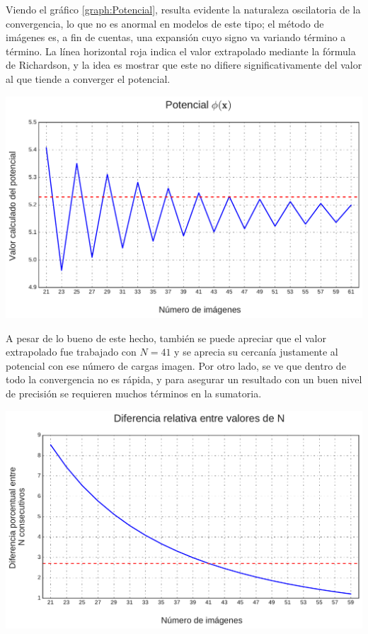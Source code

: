 \documentclass[12pt, oneside, numbers, spanish]{ezthesis}
\numberwithin{equation}{section}
\begin{document}
Viendo el gráfico \ref{graph:Potencial}, resulta evidente la naturaleza oscilatoria de la convergencia, lo que no es anormal en modelos de este tipo; el método de imágenes es, a fin de cuentas, una expansión cuyo signo va variando término a término. La línea horizontal roja indica el valor extrapolado mediante la fórmula de Richardson, y la idea es mostrar que este no difiere significativamente del valor al que tiende a converger el potencial.
\begin{graph}[h]
	\centering
	\includegraphics[scale = 0.5]{./Figures/Potencial}
	\caption{}\label{graph:Potencial}
\end{graph}
\noindent
A pesar de lo bueno de este hecho, también se puede apreciar que el valor extrapolado fue trabajado con $N=41$ y se aprecia su cercanía justamente al potencial con ese número de cargas imagen. Por otro lado, se ve que dentro de todo la convergencia no es rápida, y para asegurar un resultado con un buen nivel de precisión se requieren muchos términos en la sumatoria.
\begin{graph}[h]
	\centering
	\includegraphics[scale = 0.5]{./Figures/Error}
	\caption{}\label{graph:Error}
\end{graph}
\end{document}
